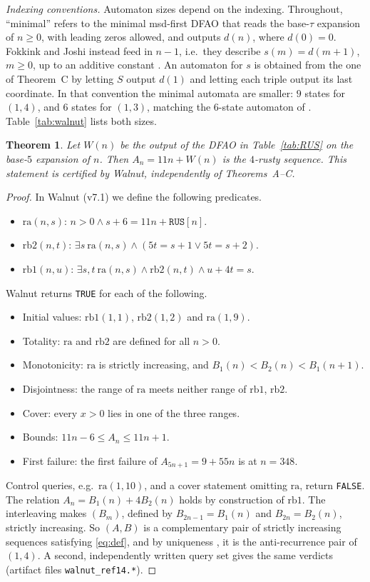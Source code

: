 \documentclass[11pt]{amsart}
\newtheorem{theorem}{Theorem}[section]
\theoremstyle{definition}
\theoremstyle{remark}
\begin{document}
\emph{Indexing conventions.} Automaton sizes depend on the indexing. Throughout, ``minimal'' refers to the minimal msd-first DFAO that reads the base-$\tau$ expansion of $n\ge0$, with leading zeros allowed, and outputs $d(n)$, where $d(0)=0$. Fokkink and Joshi instead feed in $n-1$, i.e.\ they describe $s(m)=d(m+1)$, $m\ge0$, up to an additive constant \cite[Fig.~7]{FJ}. An automaton for $s$ is obtained from the one of Theorem~C by letting $S$ output $d(1)$ and letting each triple output its last coordinate. In that convention the minimal automata are smaller: $9$ states for $(1,4)$, and $6$ states for $(1,3)$, matching the $6$-state automaton of \cite[Fig.~7]{FJ}. Table~\ref{tab:walnut} lists both sizes.

\begin{theorem}\label{thm:walnut14}
Let $W(n)$ be the output of the DFAO in Table~\ref{tab:RUS} on the base-$5$ expansion of $n$. Then $A_n=11n+W(n)$ is the $4$-rusty sequence. This statement is certified by Walnut, independently of Theorems~A--C.
\end{theorem}

\begin{proof}
In Walnut (v7.1) we define the following predicates.
\begin{itemize}
\item $\mathrm{ra}(n,s)$: $n>0\wedge s+6=11n+\texttt{RUS}[n]$.
\item $\mathrm{rb2}(n,t)$: $\exists s\ \mathrm{ra}(n,s)\wedge(5t=s+1\vee 5t=s+2)$.
\item $\mathrm{rb1}(n,u)$: $\exists s,t\ \mathrm{ra}(n,s)\wedge\mathrm{rb2}(n,t)\wedge u+4t=s$.
\end{itemize}
Walnut returns \texttt{TRUE} for each of the following.
\begin{itemize}
\item Initial values: $\mathrm{rb1}(1,1)$, $\mathrm{rb2}(1,2)$ and $\mathrm{ra}(1,9)$.
\item Totality: $\mathrm{ra}$ and $\mathrm{rb2}$ are defined for all $n>0$.
\item Monotonicity: $\mathrm{ra}$ is strictly increasing, and $B_1(n)<B_2(n)<B_1(n+1)$.
\item Disjointness: the range of $\mathrm{ra}$ meets neither range of $\mathrm{rb1}$, $\mathrm{rb2}$.
\item Cover: every $x>0$ lies in one of the three ranges.
\item Bounds: $11n-6\le A_n\le 11n+1$.
\item First failure: the first failure of $A_{5n+1}=9+55n$ is at $n=348$.
\end{itemize}
Control queries, e.g.\ $\mathrm{ra}(1,10)$, and a cover statement omitting $\mathrm{ra}$, return \texttt{FALSE}. The relation $A_n=B_1(n)+4B_2(n)$ holds by construction of $\mathrm{rb1}$. The interleaving makes $(B_m)$, defined by $B_{2n-1}=B_1(n)$ and $B_{2n}=B_2(n)$, strictly increasing. So $(A,B)$ is a complementary pair of strictly increasing sequences satisfying \eqref{eq:def}, and by uniqueness \cite[Lemma~3]{FJarxiv}, \cite[Lemma~2]{FJ} it is the anti-recurrence pair of $(1,4)$. A second, independently written query set gives the same verdicts (artifact files \texttt{walnut\_ref14.*}).
\end{proof}
\end{document}
